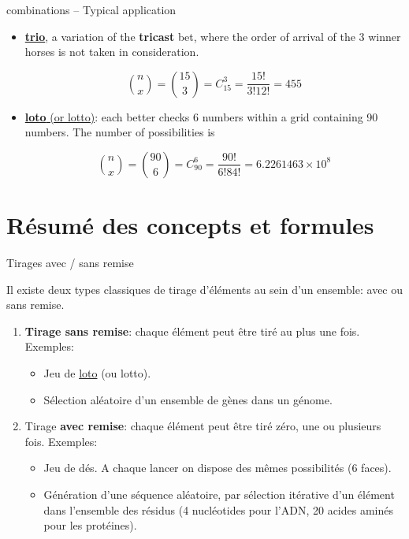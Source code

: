 \documentclass[ignorenonframetext,]{beamer}
\providecommand{\tightlist}{%
  \setlength{\itemsep}{0pt}\setlength{\parskip}{0pt}}
\begin{document}
\begin{frame}{combinations -- Typical application}
\protect\hypertarget{combinations-typical-application}{}

\begin{itemize}
\item
  \href{https://en.wikipedia.org/wiki/Trifecta}{\textbf{trio}}, a
  variation of the \textbf{tricast} bet, where the order of arrival of
  the 3 winner horses is not taken in consideration.

  \[\binom{n}{x} = \binom{15}{3} = C^3_{15} = \frac{15!}{3! 12!} = 455\]
\item
  \href{https://fr.wikipedia.org/wiki/Loto}{\textbf{loto} (or lotto)}:
  each better checks 6 numbers within a grid containing 90 numbers. The
  number of possibilities is

  \[\binom{n}{x} = \binom{90}{6} = C^6_{90} = \frac{90!}{6! 84!} = \ensuremath{6.2261463\times 10^{8}}\]
\end{itemize}

\end{frame}

\hypertarget{resume-des-concepts-et-formules}{%
\section{Résumé des concepts et
formules}\label{resume-des-concepts-et-formules}}

\begin{frame}{Tirages avec / sans remise}
\protect\hypertarget{tirages-avec-sans-remise}{}

Il existe deux types classiques de tirage d'éléments au sein d'un
ensemble: avec ou sans remise.

\begin{enumerate}
\item
  \textbf{Tirage sans remise}: chaque élément peut être tiré au plus une
  fois. Exemples:

  \begin{itemize}
  \tightlist
  \item
    Jeu de \href{https://fr.wikipedia.org/wiki/Loto}{loto} (ou lotto).
  \item
    Sélection aléatoire d'un ensemble de gènes dans un génome.
  \end{itemize}
\item
  Tirage \textbf{avec remise}: chaque élément peut être tiré zéro, une
  ou plusieurs fois. Exemples:

  \begin{itemize}
  \tightlist
  \item
    Jeu de dés. A chaque lancer on dispose des mêmes possibilités (6
    faces).
  \item
    Génération d'une séquence aléatoire, par sélection itérative d'un
    élément dans l'ensemble des résidus (4 nucléotides pour l'ADN, 20
    acides aminés pour les protéines).
  \end{itemize}
\end{enumerate}

\end{frame}
\end{document}
